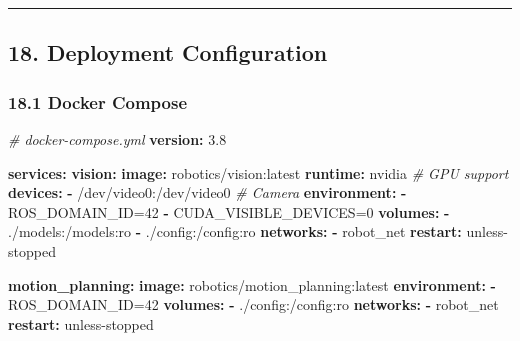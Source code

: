 \documentclass[
]{article}
\newenvironment{Shaded}{\begin{snugshade}}{\end{snugshade}}
\newcommand{\AttributeTok}[1]{\textcolor[rgb]{0.13,0.29,0.53}{#1}}
\newcommand{\CommentTok}[1]{\textcolor[rgb]{0.56,0.35,0.01}{\textit{#1}}}
\newcommand{\FunctionTok}[1]{\textcolor[rgb]{0.13,0.29,0.53}{\textbf{#1}}}
\newcommand{\KeywordTok}[1]{\textcolor[rgb]{0.13,0.29,0.53}{\textbf{#1}}}
\newcommand{\StringTok}[1]{\textcolor[rgb]{0.31,0.60,0.02}{#1}}
\begin{document}
\begin{center}\rule{0.5\linewidth}{0.5pt}\end{center}

\hypertarget{deployment-configuration}{%
\subsection{18. Deployment
Configuration}\label{deployment-configuration}}

\hypertarget{docker-compose}{%
\subsubsection{18.1 Docker Compose}\label{docker-compose}}

\begin{Shaded}
\begin{Highlighting}[]
\CommentTok{\# docker{-}compose.yml}
\FunctionTok{version}\KeywordTok{:}\AttributeTok{ }\StringTok{\textquotesingle{}3.8\textquotesingle{}}

\FunctionTok{services}\KeywordTok{:}
\AttributeTok{  }\FunctionTok{vision}\KeywordTok{:}
\AttributeTok{    }\FunctionTok{image}\KeywordTok{:}\AttributeTok{ robotics/vision:latest}
\AttributeTok{    }\FunctionTok{runtime}\KeywordTok{:}\AttributeTok{ nvidia}\CommentTok{  \# GPU support}
\AttributeTok{    }\FunctionTok{devices}\KeywordTok{:}
\AttributeTok{      }\KeywordTok{{-}}\AttributeTok{ /dev/video0:/dev/video0}\CommentTok{  \# Camera}
\AttributeTok{    }\FunctionTok{environment}\KeywordTok{:}
\AttributeTok{      }\KeywordTok{{-}}\AttributeTok{ ROS\_DOMAIN\_ID=42}
\AttributeTok{      }\KeywordTok{{-}}\AttributeTok{ CUDA\_VISIBLE\_DEVICES=0}
\AttributeTok{    }\FunctionTok{volumes}\KeywordTok{:}
\AttributeTok{      }\KeywordTok{{-}}\AttributeTok{ ./models:/models:ro}
\AttributeTok{      }\KeywordTok{{-}}\AttributeTok{ ./config:/config:ro}
\AttributeTok{    }\FunctionTok{networks}\KeywordTok{:}
\AttributeTok{      }\KeywordTok{{-}}\AttributeTok{ robot\_net}
\AttributeTok{    }\FunctionTok{restart}\KeywordTok{:}\AttributeTok{ unless{-}stopped}

\AttributeTok{  }\FunctionTok{motion\_planning}\KeywordTok{:}
\AttributeTok{    }\FunctionTok{image}\KeywordTok{:}\AttributeTok{ robotics/motion\_planning:latest}
\AttributeTok{    }\FunctionTok{environment}\KeywordTok{:}
\AttributeTok{      }\KeywordTok{{-}}\AttributeTok{ ROS\_DOMAIN\_ID=42}
\AttributeTok{    }\FunctionTok{volumes}\KeywordTok{:}
\AttributeTok{      }\KeywordTok{{-}}\AttributeTok{ ./config:/config:ro}
\AttributeTok{    }\FunctionTok{networks}\KeywordTok{:}
\AttributeTok{      }\KeywordTok{{-}}\AttributeTok{ robot\_net}
\AttributeTok{    }\FunctionTok{restart}\KeywordTok{:}\AttributeTok{ unless{-}stopped}


\end{Highlighting}
\end{Shaded}
\end{document}
